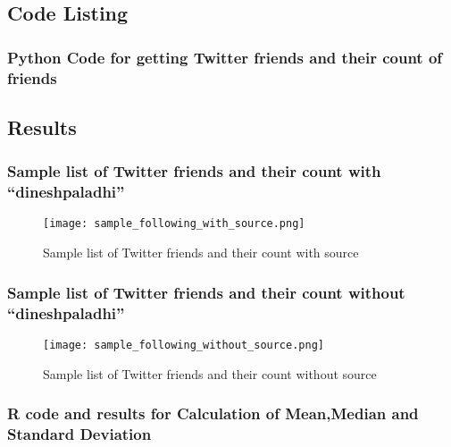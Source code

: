 \subsection{Code Listing}

\subsubsection{Python Code for getting Twitter friends and their count of friends}

\newpage

\subsection{Results}

\subsubsection{Sample list of Twitter friends and their count with ``dineshpaladhi'' }
\begin{figure}[ht]    
    \begin{center}
        \texttt{[image: sample\_following\_with\_source.png]}
        \caption{Sample list of Twitter friends and their count with source}
        \label{Sample_t3}
    \end{center}
\end{figure}
\newpage
\subsubsection{Sample list of Twitter friends and their count without ``dineshpaladhi''}
\begin{figure}[ht]    
    \begin{center}
        \texttt{[image: sample\_following\_without\_source.png]}
        \caption{Sample list of Twitter friends and their count without source}
        \label{Sample_t4}
    \end{center}
\end{figure}
\newpage
\subsubsection{R code and results for Calculation of Mean,Median and Standard Deviation}



